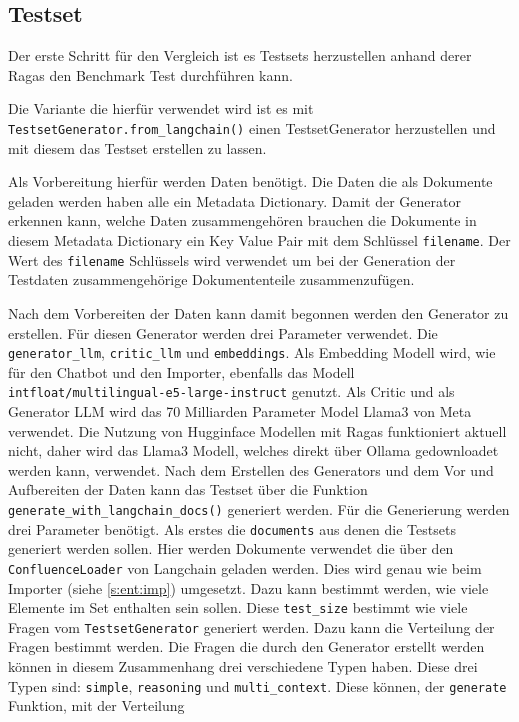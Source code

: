 \subsection{Testset}
Der erste Schritt für den Vergleich ist es Testsets herzustellen anhand
derer Ragas den Benchmark Test durchführen kann.\par
Die Variante die hierfür verwendet wird ist es mit 
 \verb+TestsetGenerator.from_langchain()+ einen TestsetGenerator 
herzustellen und mit diesem das Testset erstellen zu lassen.\par
Als Vorbereitung hierfür werden Daten benötigt. 
Die Daten die als Dokumente geladen werden haben alle ein 
Metadata Dictionary. Damit der Generator erkennen kann,
welche Daten zusammengehören brauchen die Dokumente in 
diesem Metadata Dictionary ein Key Value Pair mit dem Schlüssel 
\verb|filename|. Der Wert des \verb|filename| Schlüssels wird verwendet 
um bei der Generation der Testdaten zusammengehörige 
Dokumententeile zusammenzufügen.\par
Nach dem Vorbereiten der Daten kann damit begonnen werden den 
Generator zu erstellen.
Für diesen Generator werden drei Parameter verwendet.
Die \verb+generator_llm+, \verb+critic_llm+ und \verb+embeddings+.
Als Embedding Modell wird, wie für den Chatbot und 
den Importer, ebenfalls das Modell 
\verb|intfloat/multilingual-e5-large-instruct| genutzt. 
Als Critic und als Generator LLM wird das 70 Milliarden 
Parameter Model Llama3 von Meta verwendet. 
Die Nutzung von Hugginface Modellen mit Ragas funktioniert 
aktuell nicht, daher wird das Llama3 Modell, welches 
 direkt über Ollama gedownloadet werden kann, verwendet.
Nach dem Erstellen des Generators und dem Vor und Aufbereiten der 
Daten kann das Testset über die Funktion 
\verb+generate_with_langchain_docs()+ generiert werden. 
Für die Generierung werden drei Parameter benötigt.
Als erstes die \verb+documents+ aus denen die Testsets 
generiert werden sollen.
Hier werden Dokumente verwendet die über den \verb+ConfluenceLoader+
von Langchain geladen werden. Dies wird genau wie beim Importer (siehe \ref{s:ent:imp}) umgesetzt.
Dazu kann bestimmt werden, wie viele Elemente im Set enthalten sein sollen.
Diese \verb+test_size+ bestimmt wie viele Fragen vom \verb+TestsetGenerator+ generiert werden.
Dazu kann die Verteilung der Fragen bestimmt werden.
Die Fragen die durch den Generator erstellt werden können in diesem Zusammenhang drei verschiedene
Typen haben. Diese drei Typen sind: \verb+simple+, \verb+reasoning+ und \verb+multi_context+.
Diese können, der \verb+generate+ Funktion, mit der Verteilung 
